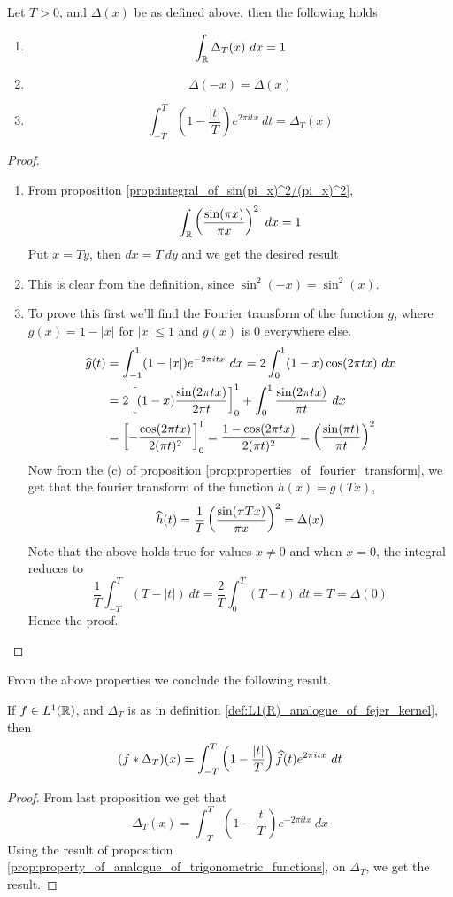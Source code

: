 \begin{proposition}
  \label{prop:properties_of_fejer_kernel_in_R}
  Let $T>0$, and $\Delta(x)$ be as defined above, then the following holds 
  \begin{enumerate}[label=(\alph*)]
    \item $$\int_\mathbb R \Delta_T(x) \ dx = 1$$
    \item $$\Delta(-x) = \Delta(x)$$
    \item $$\int_{-T}^T \left(1-\frac{|t|}{T}\right) e^{2\pi itx} \ dt = \Delta_T(x)$$
  \end{enumerate}
\end{proposition}
\begin{proof}
  \begin{enumerate}[label=(\alph*)]
    \item  
      From proposition \ref{prop:integral_of_sin(pi_x)^2/(pi_x)^2}, $$\int_\mathbb R \left(\frac{\sin(\pi x)}{\pi x}\right)^2 \ dx = 1$$
      Put $x=Ty$, then $dx = T \ dy $ and we get the desired result

    \item This is clear from the definition, since $\sin^2(-x) = \sin^2(x)$.
    \item To prove this first we'll find the Fourier transform of the function $g$, where $g(x) = 1 - |x|$ for $|x| \le 1$ and $g(x)$ is 0 everywhere else.
     \begin{align*}
       \widehat{g}(t) &= \int_{-1}^1 (1-|x|)e^{-2 \pi itx} \ dx = 2\int_0^1(1-x)\cos(2\pi tx) \ dx \\
       &= 2\left[(1-x)\frac{\sin(2\pi tx)}{2\pi t} \right]_0^1 + \int_0^1\frac{\sin(2\pi tx)}{\pi t} \ dx \\
       &= \left[-\frac{\cos(2\pi tx)}{2(\pi t)^2}\right]_0^1 = \frac{1 - \cos(2\pi tx)}{2(\pi t)^2} = \left(\frac{\sin(\pi t)}{\pi t}\right)^2
     \end{align*}
      Now from the (c) of proposition \ref{prop:properties_of_fourier_transform}, we get that the fourier transform of the function $h(x) = g(Tx)$, $$\widehat{h}(t) = \frac{1}{T}\left(\frac{\sin(\pi Tx)}{\pi x}\right)^2 = \Delta(x)$$
      Note that the above holds true for values $x\neq 0$ and when $x=0$, the integral reduces to $$\frac{1}{T}\int_{-T}^T (T-|t|) \ dt =  \frac{2}{T}\int_0^T(T-t) \ dt = T = \Delta(0)$$
    Hence the proof.
  \end{enumerate}
\end{proof}

From the above properties we conclude the following result. 
\begin{corollary}
  \label{cor:convolution_with_fejer_kernel_in_L1(R)}
  If $f\in L^1(\mathbb R)$, and $\Delta_T$ is as in definition \ref{def:L1(R)_analogue_of_fejer_kernel}, then $$(f*\Delta_T)(x) = \int_{-T}^T \left(1-\frac{|t|}{T}\right)\widehat{f}(t)e^{2\pi itx} \ dt$$
\end{corollary}
\begin{proof}
  From last proposition we get that $$\Delta_T(x) = \int_{-T}^T \left(1-\frac{|t|}{T}\right)e^{-2 \pi itx} \ dx$$
  Using the result of proposition \ref{prop:property_of_analogue_of_trigonometric_functions}, on $\Delta_T$, we get the result.
\end{proof}

